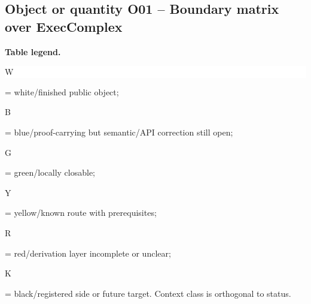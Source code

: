 \subsection*{Object or quantity O01 -- Boundary matrix over ExecComplex}
\hypertarget{objproof:O01}{}
\par\smallskip\noindent\begin{minipage}{0.99\linewidth}\footnotesize\raggedright\textbf{Table legend.} \colorbox{white}{\strut W} = white/finished public object; \colorbox{cyan!20}{\strut B} = blue/proof-carrying but semantic/API correction still open; \colorbox{green!18}{\strut G} = green/locally closable; \colorbox{yellow!25}{\strut Y} = yellow/known route with prerequisites; \colorbox{red!20}{\strut R} = red/derivation layer incomplete or unclear; \colorbox{black!18}{\strut K} = black/registered side or future target. Context class is orthogonal to status.\end{minipage}\par\vspace{0.25em}
